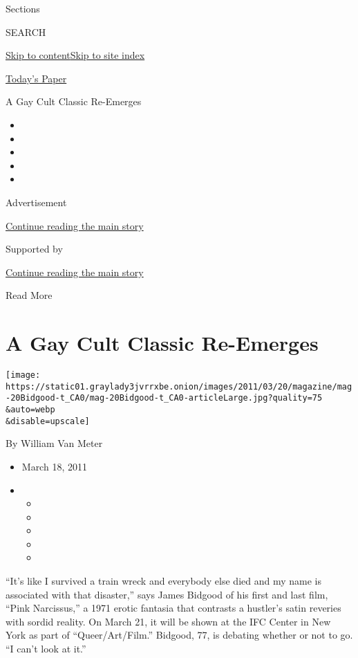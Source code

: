 Sections

SEARCH

\protect\hyperlink{site-content}{Skip to
content}\protect\hyperlink{site-index}{Skip to site index}

\href{https://myaccount.nytimes3xbfgragh.onion/auth/login?response_type=cookie\&client_id=vi}{}

\href{https://www.nytimes3xbfgragh.onion/section/todayspaper}{Today's
Paper}

A Gay Cult Classic Re-Emerges

\begin{itemize}
\item
\item
\item
\item
\item
\end{itemize}

Advertisement

\protect\hyperlink{after-top}{Continue reading the main story}

Supported by

\protect\hyperlink{after-sponsor}{Continue reading the main story}

Read More

\hypertarget{a-gay-cult-classic-re-emerges}{%
\section{A Gay Cult Classic
Re-Emerges}\label{a-gay-cult-classic-re-emerges}}

\texttt{[image: https://static01.graylady3jvrrxbe.onion/images/2011/03/20/magazine/mag-20Bidgood-t\_CA0/mag-20Bidgood-t\_CA0-articleLarge.jpg?quality=75\\\&auto=webp\\\&disable=upscale]}

By William Van Meter

\begin{itemize}
\item
  March 18, 2011
\item
  \begin{itemize}
  \item
  \item
  \item
  \item
  \item
  \end{itemize}
\end{itemize}

``It's like I survived a train wreck and everybody else died and my name
is associated with that disaster,'' says James Bidgood of his first and
last film, ``Pink Narcissus,'' a 1971 erotic fantasia that contrasts a
hustler's satin reveries with sordid reality. On March 21, it will be
shown at the IFC Center in New York as part of ``Queer/Art/Film.''
Bidgood, 77, is debating whether or not to go. ``I can't look at it.''

